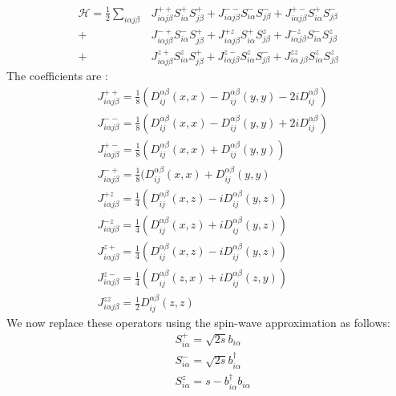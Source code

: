 \begin{equation}\label{eq33}
\begin{split}
\mathcal{H} = \frac{1}{2}\sum_{i\alpha j\beta}^{}&J^{++}_{i\alpha j\beta}S^{+}_{i\alpha}S^{+}_{j\beta} + J^{--}_{i\alpha j\beta}S^{-}_{i\alpha}S^{-}_{j\beta} + J^{+-}_{i\alpha j\beta}S^{+}_{i\alpha}S^{-}_{j\beta}\\ + &J^{-+}_{i\alpha j\beta}S^{-}_{i\alpha}S^{+}_{j\beta} + J^{+z}_{i\alpha j\beta}S^{+}_{i\alpha}S^{z}_{j\beta} + J^{-z}_{i\alpha j\beta}S^{-}_{i\alpha}S^{z}_{j\beta}\\ + &J^{z+}_{i\alpha 
	j\beta}S^{z}_{i\alpha}S^{+}_{j\beta} + J^{z-}_{i\alpha
	j\beta}S^{z}_{i\alpha}S^{-}_{j\beta} + J^{zz}_{i\alpha\
	j\beta}S^{z}_{i\alpha}S^{z}_{j\beta}			
\end{split}
\end{equation}
The coefficients are :
\begin{equation}\label{eq34}
\begin{split}
&J^{++}_{i\alpha j\beta} = \frac{1}{8}(D^{\alpha \beta}_{ij}(x,x) - D^{\alpha \beta}_{ij}(y,y) - 2iD^{\alpha \beta}_{ij} )\\
&J^{--}_{i\alpha j\beta} = \frac{1}{8}( D^{\alpha \beta}_{ij}(x,x) - D^{\alpha \beta}_{ij}(y,y) + 2iD^{\alpha \beta}_{ij} )\\
&J^{+-}_{i\alpha j\beta} = \frac{1}{8} ( D^{\alpha \beta}_{ij} (x,x) + D^{\alpha \beta}_{ij}(y,y) )\\
&J^{-+}_{i\alpha j\beta} = \frac{1}{8} ( D^{\alpha \beta}_{ij} (x,x) + D^{\alpha \beta}_{ij}(y,y)\\
&J^{+z}_{i\alpha j\beta} = \frac{1}{4}( D^{\alpha \beta}_{ij}( x,z ) - iD^{\alpha \beta}_{ij}(y,z) )\\
&J^{-z}_{i\alpha j\beta} = \frac{1}{4}( D^{\alpha \beta}_{ij}( x,z ) + iD^{\alpha \beta}_{ij}(y,z) )\\
&J^{z+}_{i\alpha j\beta} = \frac{1}{4}( D^{\alpha \beta}_{ij}( x,z ) - iD^{\alpha \beta}_{ij}(y,z) )\\
&J^{z-}_{i\alpha j\beta} = \frac{1}{4}( D^{\alpha \beta}_{ij}( z,x ) + iD^{\alpha \beta}_{ij}(z,y) )\\
&J^{zz}_{i\alpha j\beta} = \frac{1}{2}D^{\alpha \beta}_{ij}(z,z) 			
\end{split}
\end{equation}
We now replace these operators using the spin-wave approximation as follows:
\begin{equation}\label{eq35}
\begin{split}
&S^{+}_{i\alpha} = \sqrt{2s}b_{i\alpha}\\
&S^{-}_{i\alpha} = \sqrt{2s}b_{i\alpha}^\dagger\\
&S^{z}_{i\alpha} = s - b_{i\alpha}^\dagger b_{i\alpha}
\end{split}
\end{equation}
